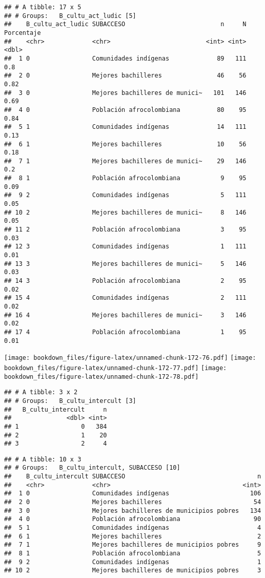 \documentclass[]{article}
\theoremstyle{definition}
\theoremstyle{definition}
\theoremstyle{definition}
\theoremstyle{remark}
\begin{document}
\begin{verbatim}
## # A tibble: 17 x 5
## # Groups:   B_cultu_act_ludic [5]
##    B_cultu_act_ludic SUBACCESO                          n     N Porcentaje
##    <chr>             <chr>                          <int> <int>      <dbl>
##  1 0                 Comunidades indígenas             89   111       0.8 
##  2 0                 Mejores bachilleres               46    56       0.82
##  3 0                 Mejores bachilleres de munici~   101   146       0.69
##  4 0                 Población afrocolombiana          80    95       0.84
##  5 1                 Comunidades indígenas             14   111       0.13
##  6 1                 Mejores bachilleres               10    56       0.18
##  7 1                 Mejores bachilleres de munici~    29   146       0.2 
##  8 1                 Población afrocolombiana           9    95       0.09
##  9 2                 Comunidades indígenas              5   111       0.05
## 10 2                 Mejores bachilleres de munici~     8   146       0.05
## 11 2                 Población afrocolombiana           3    95       0.03
## 12 3                 Comunidades indígenas              1   111       0.01
## 13 3                 Mejores bachilleres de munici~     5   146       0.03
## 14 3                 Población afrocolombiana           2    95       0.02
## 15 4                 Comunidades indígenas              2   111       0.02
## 16 4                 Mejores bachilleres de munici~     3   146       0.02
## 17 4                 Población afrocolombiana           1    95       0.01
\end{verbatim}

\texttt{[image: bookdown\_files/figure-latex/unnamed-chunk-172-76.pdf]}
\texttt{[image: bookdown\_files/figure-latex/unnamed-chunk-172-77.pdf]}
\texttt{[image: bookdown\_files/figure-latex/unnamed-chunk-172-78.pdf]}

\begin{verbatim}
## # A tibble: 3 x 2
## # Groups:   B_cultu_intercult [3]
##   B_cultu_intercult     n
##               <dbl> <int>
## 1                 0   384
## 2                 1    20
## 3                 2     4
\end{verbatim}

\begin{verbatim}
## # A tibble: 10 x 3
## # Groups:   B_cultu_intercult, SUBACCESO [10]
##    B_cultu_intercult SUBACCESO                                    n
##    <chr>             <chr>                                    <int>
##  1 0                 Comunidades indígenas                      106
##  2 0                 Mejores bachilleres                         54
##  3 0                 Mejores bachilleres de municipios pobres   134
##  4 0                 Población afrocolombiana                    90
##  5 1                 Comunidades indígenas                        4
##  6 1                 Mejores bachilleres                          2
##  7 1                 Mejores bachilleres de municipios pobres     9
##  8 1                 Población afrocolombiana                     5
##  9 2                 Comunidades indígenas                        1
## 10 2                 Mejores bachilleres de municipios pobres     3
\end{verbatim}
\end{document}
